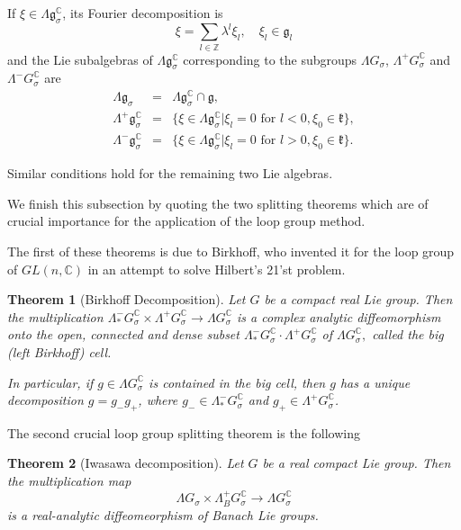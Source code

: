 \documentclass[a4paper,11pt]{amsart}
\newtheorem{theorem}{Theorem}[section]
\theoremstyle{definition}
\numberwithin{equation}{section}
\newcommand{\C}{\mathbb{C}}
\begin{document}
If $\xi \in \Lambda \mathfrak{g}^{\mathbb C}_{\sigma}$, its Fourier decomposition is
$$\xi=\sum_{l \in \mathbb{Z}} \lambda^l\xi_l, \quad \xi_l \in \mathfrak{g}_l$$
and the Lie subalgebras of $\Lambda \mathfrak{g}^{\mathbb C}_{\sigma}$ corresponding to the subgroups
$\Lambda G_{\sigma}$, $\Lambda^{+} G^{\mathbb C}_{\sigma}$ and $\Lambda^{-} G^{\mathbb C}_{\sigma}$ are
\begin{eqnarray*}
\Lambda \mathfrak{g}_{\sigma}&=&\Lambda \mathfrak{g}^{\mathbb C}_{\sigma}\cap \mathfrak{g},
\\
\Lambda^{+}\mathfrak{g}^{\mathbb C}_{\sigma}&=&\{\xi\in \Lambda \mathfrak{g}^{\mathbb C}_{\sigma} |
\xi_l=0 \text{ for } l<0, \xi_0\in \mathfrak{k}\},\\
\Lambda^{-}\mathfrak{g}^{\mathbb C}_{\sigma}&=&\{\xi\in \Lambda \mathfrak{g}^{\mathbb C}_{\sigma} |
\xi_l=0 \text{ for } l>0, \xi_0\in \mathfrak{k}\}.
\end{eqnarray*}

Similar conditions hold for the remaining two Lie algebras.

We finish this subsection by quoting the two splitting theorems which are of 
crucial importance for the application of the loop group method.

The first of these theorems is due to Birkhoff, who invented it for the loop group of $GL(n,\C)$ in an attempt to solve Hilbert's 21'{st} problem. 

\begin{theorem}[Birkhoff Decomposition]
Let $G$ be a compact real Lie group. Then the multiplication $\Lambda^{-}_{*} G^{\mathbb C}_{\sigma} \times \Lambda^{+} G^{\mathbb C}_{\sigma} \rightarrow \Lambda G^{\mathbb C}_{\sigma}$ is a 
complex analytic diffeomorphism onto the open, connected  and dense subset 
$\Lambda^{-}_{*} G^{\mathbb C}_{\sigma}\cdot \Lambda^{+} G^{\mathbb C}_{\sigma}$ of  $\Lambda G^{\mathbb C}_{\sigma},$
called the big (left Birkhoff) cell. 

In particular, if $g\in \Lambda G^{\mathbb C}_{\sigma}$ is contained in the big cell,  then
$g$ has a unique decomposition $g=g_{-}g_{+}$, where $g_{-}\in \Lambda_{*}^{-} G_{\sigma}^{\mathbb C}$ 
and $g_{+}\in \Lambda^{+}G^{\mathbb C}_{\sigma}$.
\end{theorem}

The second crucial loop group splitting theorem is the following

\begin{theorem}[Iwasawa decomposition]

Let $G$ be a real compact Lie group. Then the multiplication map 
$$\Lambda G_{\sigma}\times \Lambda^{+}_B G_{\sigma}^{\mathbb C} 
\rightarrow \Lambda G_{\sigma}^{\mathbb C}$$
is a real-analytic diffeomeorphism of Banach Lie groups.
\end{theorem}
\end{document}
